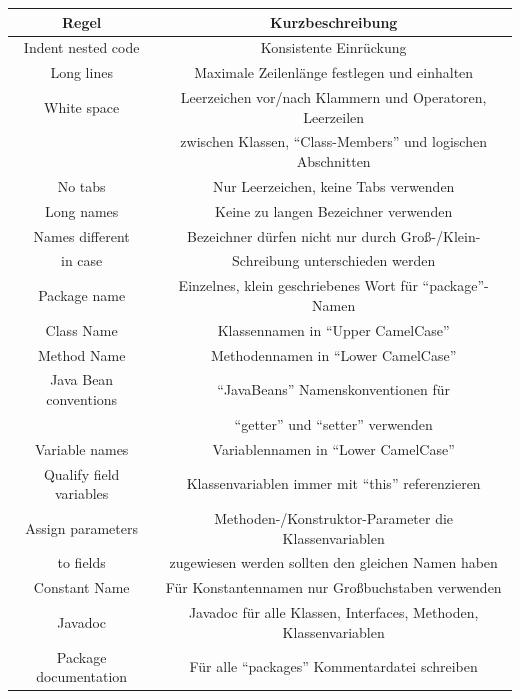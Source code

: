 \documentclass[da,ngerman]{stthesis}
\begin{document}
				\begin{center}
					\tabulinesep=1.5mm
					\begin{longtabu}{|c|c|}
						\hline
  						\textbf{Regel} & \textbf{Kurzbeschreibung}\\
  						\hline
  						Indent nested code & Konsistente Einrückung \\
  						\hline
  						Long lines & Maximale Zeilenlänge festlegen und einhalten \\
  						\hline
  						White space & Leerzeichen vor/nach Klammern und Operatoren, Leerzeilen \\ & zwischen Klassen, "`Class-Members"' und logischen Abschnitten \\
  						\hline 
  						No tabs & Nur Leerzeichen, keine Tabs verwenden \\
  						\hline
  						Long names & Keine zu langen Bezeichner verwenden \\
  						\hline
  						Names different & Bezeichner dürfen nicht nur durch Groß-/Klein- \\ in case & Schreibung unterschieden werden \\
  						\hline
  						Package name & Einzelnes, klein geschriebenes Wort für "`package"'-Namen \\
  						\hline
  						Class Name & Klassennamen in "`Upper CamelCase"' \\  							\hline
  						Method Name & Methodennamen in "`Lower CamelCase"' \\ 
  						\hline
  						Java Bean conventions & "`JavaBeans"' Namenskonventionen für \\ & "`getter"' und "`setter"' verwenden \\
  						\hline
  						Variable names & Variablennamen in "`Lower CamelCase"' \\ 
  						\hline
  						Qualify field variables & Klassenvariablen immer mit "`this"' referenzieren \\
  						\hline
  						Assign parameters & Methoden-/Konstruktor-Parameter die Klassenvariablen \\ to fields & zugewiesen werden sollten den gleichen Namen haben \\
  						\hline
  						Constant Name & Für Konstantennamen nur Großbuchstaben verwenden \\
  						\hline
  						Javadoc & Javadoc für alle Klassen, Interfaces, Methoden, Klassenvariablen \\
  						\hline
  						Package documentation & Für alle "`packages"' Kommentardatei schreiben \\

\end{longtabu}
\end{center}
\end{document}
